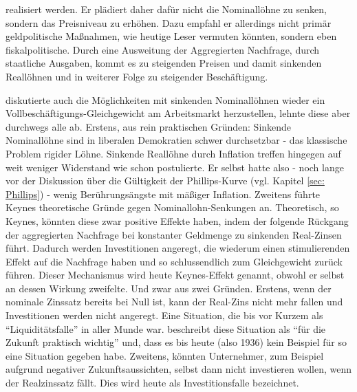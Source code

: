 realisiert werden. Er plädiert daher dafür nicht die Nominallöhne zu senken, sondern das Preisniveau zu erhöhen. Dazu empfahl er allerdings nicht primär geldpolitische Maßnahmen, wie heutige Leser vermuten könnten, sondern eben fiskalpolitische. Durch eine Ausweitung der Aggregierten Nachfrage, durch staatliche Ausgaben, kommt es zu steigenden Preisen und damit sinkenden Reallöhnen und in weiterer Folge zu steigender Beschäftigung.

\textcite{Keynes1936} diskutierte auch die Möglichkeiten mit sinkenden Nominallöhnen wieder ein Vollbeschäftigungs-Gleichgewicht am Arbeitsmarkt herzustellen, lehnte diese aber durchwegs alle ab. Erstens, aus rein praktischen Gründen: Sinkende Nominallöhne sind in liberalen Demokratien schwer durchsetzbar - das klassische Problem rigider Löhne. Sinkende Reallöhne durch Inflation treffen hingegen auf weit weniger Widerstand wie \textcite[S. 14]{Keynes1936} schon postulierte. Er selbst hatte also - noch lange vor der Diskussion über die Gültigkeit der Phillips-Kurve (vgl. Kapitel \ref{sec: Phillips}) - wenig Berührungsängste mit mäßiger Inflation. Zweitens führte Keynes theoretische Gründe gegen Nominallohn-Senkungen an. Theoretisch, so Keynes, könnten diese zwar positive Effekte haben, indem der folgende Rückgang der aggregierten Nachfrage bei konstanter Geldmenge zu sinkenden Real-Zinsen führt. Dadurch werden Investitionen angeregt, die wiederum einen stimulierenden Effekt auf die Nachfrage haben und so schlussendlich zum Gleichgewicht zurück führen. Dieser Mechanismus wird heute Keynes-Effekt genannt, obwohl er selbst an dessen Wirkung zweifelte. Und zwar aus zwei Gründen. Erstens, wenn der nominale Zinssatz bereits bei Null ist, kann der Real-Zins nicht mehr fallen und Investitionen werden nicht angeregt. Eine Situation, die bis vor Kurzem als "`Liquiditätsfalle"' in aller Munde war. \textcite[S. 207]{Keynes1936} beschreibt diese Situation als "`für die Zukunft praktisch wichtig"' und, dass es bis heute (also 1936) kein Beispiel für so eine Situation gegeben habe. Zweitens, könnten Unternehmer, zum Beispiel aufgrund negativer Zukunftsaussichten, selbst dann nicht investieren wollen, wenn der Realzinssatz fällt. Dies wird heute als Investitionsfalle bezeichnet.

